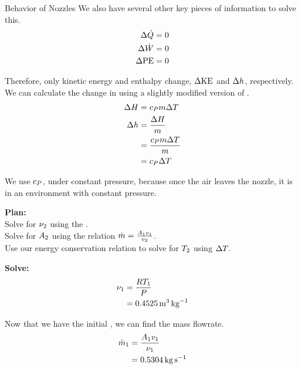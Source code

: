 \begin{example}{Behavior of Nozzles}
  We also have several other key pieces of information to solve this.
  \begin{align*}
    \Delta \dot{Q} &= 0 \\
    \Delta \dot{W} &= 0 \\
    \Delta \mathrm{PE} &= 0 \\
  \end{align*}

  Therefore, only kinetic energy and enthalpy change, $\Delta \mathrm{KE}$ and $\Delta h$, respectively.
  We can calculate the change in  using a slightly modified version of .
  \begin{align*}
    \Delta H &= c_{P} m \Delta T \\
    \Delta h &= \frac{\Delta H}{m} \\
                       &= \frac{c_{P} m \Delta T}{m} \\
                       &= c_{P} \Delta T
  \end{align*}

  We use $c_{P}$,  under constant pressure, because once the air leaves the nozzle, it is in an environment with constant pressure.

  \textbf{Plan:} \\
  Solve for $\nu_{2}$ using the . \\
  Solve for $A_{2}$ using the relation $\dot{m} = \frac{A_{1} v_{1}}{v_{2}}$. \\
  Use our energy conservation relation to solve for $T_{2}$ using $\Delta T$.

  \textbf{Solve:} \\
  \begin{align*}
    \nu_{1} &= \frac{R T_{1}}{P} \\
                        &= \SI{0.4525}{\meter\cubed\per\kilo\gram}
  \end{align*}

  Now that we have the initial , we can find the mass flowrate.
  \begin{align*}
    \dot{m}_{1} &= \frac{A_{1} v_{1}}{\nu_{1}} \\
                         &= \SI{0.5304}{\kilo\gram\per\second}
  \end{align*}


\end{example}
